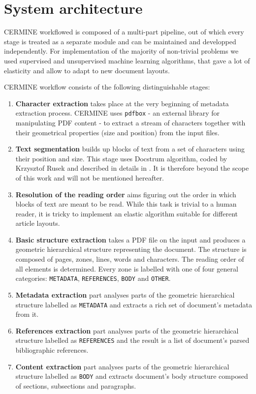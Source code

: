 \chapter{System architecture}
CERMINE workflowed is composed of a multi-part pipeline, out of which every stage is treated as a separate module and can be maintained and developped independently. For implementation of the majority of non-trivial problems we used supervised and unsupervised machine learning algorithms, that gave a lot of elasticity and allow to adapt to new document layouts.

\quad
CERMINE workflow consists of the following distinguishable stages:
\begin{enumerate}
    \item \textbf{Character extraction} takes place at the very beginning of metadata extraction process. CERMINE uses \verb+pdfbox+ - an external library for manipulating PDF content - to extract a stream of characters together with their geometrical properties (size and position) from the input files.
    \item \textbf{Text segmentation} builds up blocks of text from a set of characters using their position and size. This stage uses Docstrum algorithm, coded by Krzysztof Rusek and described in details in \cite{O'Gorman1993}. It is therefore beyond the scope of this work and will not be mentioned hereafter.
    \item \textbf{Resolution of the reading order} aims figuring out the order in which blocks of text are meant to be read. While this task is trivial to a human reader, it is tricky to implement an elastic algorithm suitable for different article layouts.
    \item \textbf{Basic structure extraction} takes a PDF file on the input and produces a geometric hierarchical structure representing the document. The structure is composed of pages, zones, lines, words and characters. The reading order of all elements is determined. Every zone is labelled with one of four general categories: \verb+METADATA+, \verb+REFERENCES+, \verb+BODY+ and \verb+OTHER+.
    \item \textbf{Metadata extraction} part analyses parts of the geometric hierarchical structure labelled as \verb+METADATA+ and extracts a rich set of document's metadata from it.
    \item \textbf{References extraction} part analyses parts of the geometric hierarchical structure labelled as \verb+REFERENCES+ and the result is a list of document's parsed bibliographic references.
    \item \textbf{Content extraction} part analyses parts of the geometric hierarchical structure labelled as \verb+BODY+ and extracts document's body structure composed of sections, subsections and paragraphs. 
\end{enumerate}
